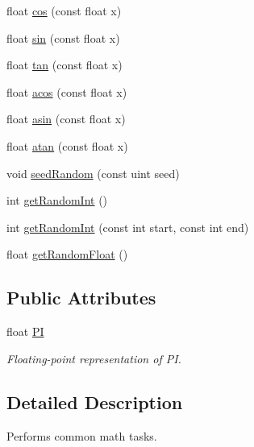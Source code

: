 \begin{DoxyCompactItemize}
\item 
float \hyperlink{class_math_ab1801cb8c65cabd716a7f34aff3cd26b}{cos} (const float x)
\item 
float \hyperlink{class_math_a4a03e84766f53d3dea1288d636e604e8}{sin} (const float x)
\item 
float \hyperlink{class_math_a7168417d8f47aa41084e47e1bf9d61b2}{tan} (const float x)
\item 
float \hyperlink{class_math_a61ed4331b09a43915d126c3657bb5ea7}{acos} (const float x)
\item 
float \hyperlink{class_math_a3c45cd25003e1494e7767b8fa7c60b21}{asin} (const float x)
\item 
float \hyperlink{class_math_a6001f10f33afb18d79a4473af39cb890}{atan} (const float x)
\item 
void \hyperlink{class_math_a92c1921494c3d085b39ceaab9a4d374e}{seed\+Random} (const uint seed)
\item 
int \hyperlink{class_math_a1d0c50629d4a49194b48ab4077cc782d}{get\+Random\+Int} ()
\item 
int \hyperlink{class_math_a4ac65373d33d5934fdf92677c7eb2086}{get\+Random\+Int} (const int start, const int end)
\item 
float \hyperlink{class_math_a79e8aea5a85bfa104e21410ad3eb7f69}{get\+Random\+Float} ()
\end{DoxyCompactItemize}
\subsection*{Public Attributes}
\begin{DoxyCompactItemize}
\item 
\hypertarget{class_math_a4c43e2b8db2027e48251350d972a39c2}{float \hyperlink{class_math_a4c43e2b8db2027e48251350d972a39c2}{P\+I}}\label{class_math_a4c43e2b8db2027e48251350d972a39c2}

\begin{DoxyCompactList}\small\item\em Floating-\/point representation of P\+I. \end{DoxyCompactList}\end{DoxyCompactItemize}


\subsection{Detailed Description}
Performs common math tasks. 


